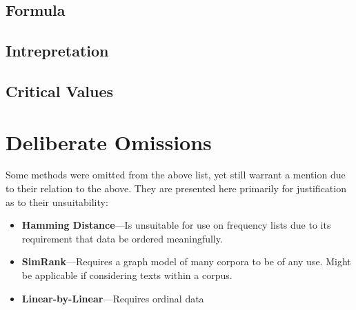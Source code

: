 \documentclass[11pt]{article}
\begin{document}
\subsection{Formula}

\subsection{Intrepretation}

\subsection{Critical Values}

\appendix

\section{Deliberate Omissions}
Some methods were omitted from the above list, yet still warrant a mention due to their relation to the above.  They are presented here primarily for justification as to their unsuitability:
\begin{itemize}
    \item \textbf{Hamming Distance}---Is unsuitable for use on frequency lists due to its requirement that data be ordered meaningfully.
    \item \textbf{SimRank}---Requires a graph model of many corpora to be of any use.  Might be applicable if considering texts within a corpus.
    \item \textbf{Linear-by-Linear}---Requires ordinal data
\end{itemize}
\end{document}
